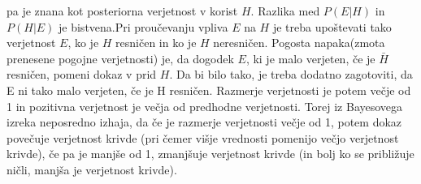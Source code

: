 \documentclass[12pt,a4paper]{amsart}
\theoremstyle{definition} %
\theoremstyle{plain} %
\begin{document}
pa je znana kot posteriorna verjetnost v korist $H$. Razlika med $P(E \lvert H)$ in $P(H \lvert E)$ je bistvena.Pri proučevanju vpliva
$E$ na $H$ je treba upoštevati tako verjetnost $E$, ko je $H$ resničen in ko je $H$ neresničen. Pogosta napaka(zmota prenesene pogojne
verjetnosti) je, da dogodek $E$, ki je malo verjeten, če je $\bar{H}$ resničen, pomeni dokaz v prid $H$. Da bi bilo tako, je treba dodatno
zagotoviti, da E ni tako malo verjeten, če je H resničen. Razmerje verjetnosti je potem večje od 1 in pozitivna verjetnost je večja od
predhodne verjetnosti. Torej iz Bayesovega izreka neposredno izhaja, da če je razmerje verjetnosti večje od 1, potem dokaz povečuje
verjetnost krivde (pri čemer višje vrednosti pomenijo večjo verjetnost krivde), če pa je manjše od 1, zmanjšuje verjetnost krivde
(in bolj ko se približuje ničli, manjša je verjetnost krivde).

\end{document}
